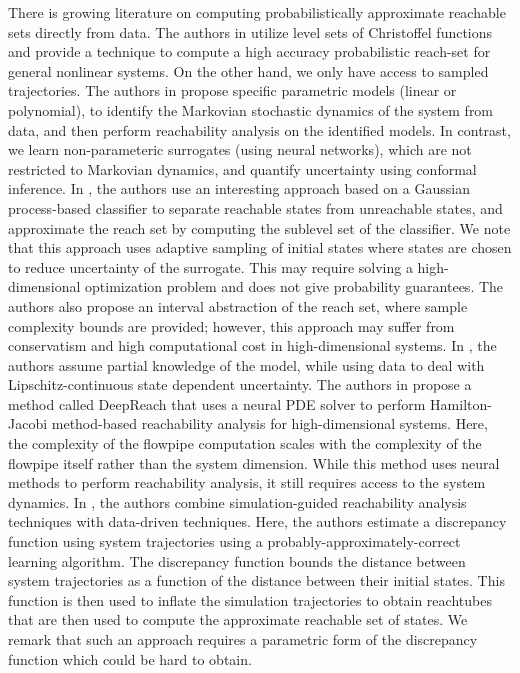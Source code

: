 There is growing literature on computing probabilistically approximate reachable sets directly from data.
The authors  in \cite{devonport2021data} utilize level sets of Christoffel functions and provide a technique to 
compute a high accuracy probabilistic reach-set for general nonlinear systems. On the other hand, we only have access to sampled trajectories.
The authors in \cite{alanwar2023data} propose specific parametric models (linear or polynomial),
to identify the Markovian stochastic dynamics of the system from data, and then perform reachability analysis on
the identified models. In contrast, we learn non-parameteric surrogates (using neural networks), which are not
restricted to Markovian dynamics, and quantify uncertainty using conformal inference.
In \cite{devonport2020data}, the authors use an interesting approach based on a Gaussian process-based
classifier to separate reachable states from unreachable states, and approximate the reach set by 
computing the sublevel set of the classifier. We note that this approach uses adaptive sampling of 
initial states where states are chosen to reduce uncertainty of the surrogate. This may require solving
a high-dimensional optimization problem and does not give probability guarantees. The authors also
propose an interval abstraction of the reach set, where sample complexity bounds are provided; however,
this approach may suffer from conservatism and high computational cost in high-dimensional systems.
In \cite{fisac2018general}, the authors assume partial knowledge of the model, while using data to deal
with Lipschitz-continuous state dependent uncertainty. 
The authors in \cite{lin2023generating} propose a method called DeepReach that uses a neural PDE solver 
to perform Hamilton-Jacobi method-based reachability analysis for high-dimensional systems. Here,
the complexity of the flowpipe computation scales with the complexity of the flowpipe itself
rather than the system dimension. While this method uses neural methods to perform reachability
analysis, it still requires access to the system dynamics. In \cite{dryvr}, the authors combine
simulation-guided reachability analysis techniques with data-driven techniques. Here, the authors
estimate a discrepancy function using system trajectories using a probably-approximately-correct 
learning algorithm. The discrepancy function bounds the distance between system trajectories
as a function of the distance between their initial states. This function is then used to inflate
the simulation trajectories to obtain reachtubes that are then used to compute the approximate
reachable set of states. We remark that such an approach requires a parametric form of the discrepancy
function which could be hard to obtain.

